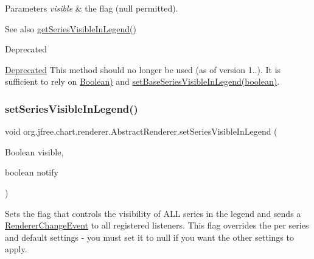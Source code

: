 \begin{DoxyParams}{Parameters}
{\em visible} & the flag ({\ttfamily null} permitted).\\
\hline
\end{DoxyParams}
\begin{DoxySeeAlso}{See also}
\mbox{\hyperlink{classorg_1_1jfree_1_1chart_1_1renderer_1_1_abstract_renderer_afa4d326cb72c09bce35c28534efd7ec0}{get\+Series\+Visible\+In\+Legend()}}
\end{DoxySeeAlso}
\begin{DoxyRefDesc}{Deprecated}
\item[\mbox{\hyperlink{deprecated__deprecated000114}{Deprecated}}]This method should no longer be used (as of version 1..). It is sufficient to rely on \mbox{\hyperlink{}{Boolean)}} and \mbox{\hyperlink{classorg_1_1jfree_1_1chart_1_1renderer_1_1_abstract_renderer_a9e6708a1410b3575666ecd84f2151f7c}{set\+Base\+Series\+Visible\+In\+Legend(boolean)}}. \end{DoxyRefDesc}
\mbox{\label{classorg_1_1jfree_1_1chart_1_1renderer_1_1_abstract_renderer_a673f84a46a327d3d343944e59602f6ca}} 
\subsubsection{\texorpdfstring{set\+Series\+Visible\+In\+Legend()}{setSeriesVisibleInLegend()}\hspace{0.1cm}{\footnotesize\ttfamily [4/4]}}
{\footnotesize\ttfamily void org.\+jfree.\+chart.\+renderer.\+Abstract\+Renderer.\+set\+Series\+Visible\+In\+Legend (\begin{DoxyParamCaption}\item[{Boolean}]{visible,  }\item[{boolean}]{notify }\end{DoxyParamCaption})}

Sets the flag that controls the visibility of A\+LL series in the legend and sends a \mbox{\hyperlink{}{Renderer\+Change\+Event}} to all registered listeners. This flag overrides the per series and default settings -\/ you must set it to {\ttfamily null} if you want the other settings to apply.


